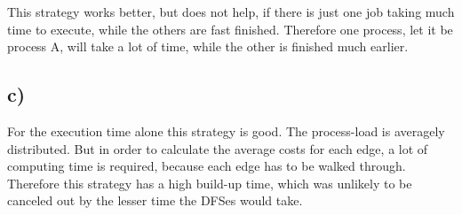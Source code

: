 \documentclass[10pt,a4paper]{scrartcl}
\begin{document}
        This strategy works better, but does not help, if there is just one job
        taking much time to execute, while the others are fast finished.
        Therefore one process, let it be process A, will take a lot of
        time, while the other is finished much earlier.

\subsection{c)}

        For the execution time alone this strategy is good. The process-load is
        averagely distributed. But in order to calculate the average costs for
        each edge, a lot of computing time is required, because each edge has to
        be walked through. Therefore this strategy has a high build-up time,
        which was unlikely to be canceled out by the lesser time the DFSes
        would take.
\end{document}
